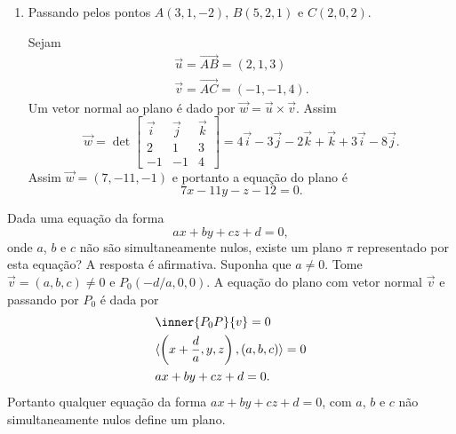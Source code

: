 \begin{exemplos}
\begin{enumerate}
\begin{solucao}
\begin{figure}[!h]
            \end{figure}
        \end{solucao}
        \item Passando pelos pontos $A(3,1,-2)$, $B(5,2,1)$ e $C(2,0,2)$.
        \begin{solucao}
            Sejam
            \begin{align*}
                \vec{u} = \vec{AB} = (2,1,3)\\
                \vec{v} = \vec{AC} = (-1,-1,4).
            \end{align*}
            Um vetor normal ao plano é dado por $\vec{w} = \vec{u}\times\vec{v}$. Assim
            \[
                \vec{w} = \det \begin{bmatrix}
                    \vec{i} & \vec{j} & \vec{k}\\
                    2 & 1 & 3\\
                    -1 & -1 & 4
                \end{bmatrix} = 4\vec{i} - 3\vec{j} - 2\vec{k} + \vec{k} + 3\vec{i} - 8\vec{j}.
            \]
            Assim $\vec{w} = (7,-11,-1)$ e portanto a equação do plano é
            \[
                7x - 11y - z - 12 = 0.
            \]
        \end{solucao}
    \end{enumerate}
\end{exemplos}

Dada uma equação da forma
    \[
        ax + by + cz + d = 0,
    \]
onde $a$, $b$ e $c$ não são simultaneamente nulos, existe um plano $\pi$ representado por esta equação? A resposta é afirmativa. Suponha que $a \ne 0$. Tome $\vec{v} = (a,b,c) \ne 0$ e $P_0(-d/a,0,0)$. A equação do plano com vetor normal $\vec{v}$ e passando por $P_0$ é dada por
    \begin{align*}
        &\inner{P_0P}{v} = 0\\
        &\langle\left(x + \dfrac{d}{a},y,z\right), (a,b,c)\rangle = 0\\
        &ax + by + cz + d = 0.
    \end{align*}
Portanto qualquer equação da forma $ax + by + cz + d = 0$, com $a$, $b$ e $c$ não simultaneamente nulos define um plano.

